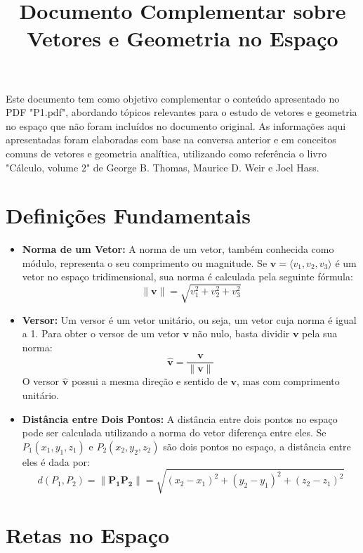 \documentclass{article}
\begin{document}
\title{Documento Complementar sobre Vetores e Geometria no Espaço}
\author{}
\date{}
\maketitle

Este documento tem como objetivo complementar o conteúdo apresentado no PDF "P1.pdf", abordando tópicos relevantes para o estudo de vetores e geometria no espaço que não foram incluídos no documento original. As informações aqui apresentadas foram elaboradas com base na conversa anterior e em conceitos comuns de vetores e geometria analítica, utilizando como referência o livro "Cálculo, volume 2" de George B. Thomas, Maurice D. Weir e Joel Hass.

\section{Definições Fundamentais}

\begin{itemize}
    \item \textbf{Norma de um Vetor:} A norma de um vetor, também conhecida como módulo, representa o seu comprimento ou magnitude. Se \(\mathbf{v} = \langle v_1, v_2, v_3 \rangle\) é um vetor no espaço tridimensional, sua norma é calculada pela seguinte fórmula:
    \[
    \|\mathbf{v}\| = \sqrt{v_1^2 + v_2^2 + v_3^2}
    \]
    \item \textbf{Versor:} Um versor é um vetor unitário, ou seja, um vetor cuja norma é igual a 1. Para obter o versor de um vetor \(\mathbf{v}\) não nulo, basta dividir \(\mathbf{v}\) pela sua norma:
    \[
    \hat{\mathbf{v}} = \frac{\mathbf{v}}{\|\mathbf{v}\|}
    \]
    O versor \(\hat{\mathbf{v}}\) possui a mesma direção e sentido de \(\mathbf{v}\), mas com comprimento unitário.
    \item \textbf{Distância entre Dois Pontos:} A distância entre dois pontos no espaço pode ser calculada utilizando a norma do vetor diferença entre eles. Se \(P_1(x_1, y_1, z_1)\) e \(P_2(x_2, y_2, z_2)\) são dois pontos no espaço, a distância entre eles é dada por:
    \[
    d(P_1, P_2) = \|\mathbf{P_1P_2}\| = \sqrt{(x_2 - x_1)^2 + (y_2 - y_1)^2 + (z_2 - z_1)^2}
    \]
\end{itemize}

\section{Retas no Espaço}
\end{document}
